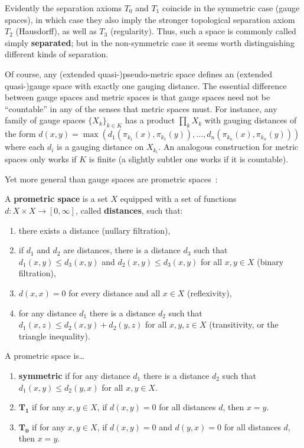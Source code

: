 \documentclass{article}
\def\Rp{[0,\infty]}
\begin{document}
Evidently the separation axioms $T_0$ and $T_1$ coincide in the symmetric case (gauge spaces), in which case they also imply the stronger topological separation axiom $T_2$ (Hausdorff), as well as $T_3$ (regularity).
Thus, such a space is commonly called simply \textbf{separated}; but in the non-symmetric case it seems worth distinguishing different kinds of separation.

Of course, any (extended quasi-)pseudo-metric space defines an (extended quasi-)gauge space with exactly one gauging distance.
The essential difference between gauge spaces and metric spaces is that gauge spaces need not be ``countable'' in any of the senses that metric spaces must.
For instance, any family of gauge spaces $\{X_k\}_{k\in K}$ has a product $\prod_k X_k$ with gauging distances of the form $d(x,y) = \max(d_1(\pi_{k_1}(x),\pi_{k_1}(y)),\dots,d_n(\pi_{k_n}(x),\pi_{k_n}(y)))$ where each $d_i$ is a gauging distance on $X_{k_i}$.
An analogous construction for metric spaces only works if $K$ is finite (a slightly subtler one works if it is countable).

Yet more general than gauge spaces are prometric spaces~\cite{cht:one-setting}:

\begin{defn}
  A \textbf{prometric space} is a set $X$ equipped with a set of functions $d:X\times X\to\Rp$, called \textbf{distances}, such that:
  \begin{enumerate}
  \item there exists a distance (nullary filtration),
  \item if $d_1$ and $d_2$ are distances, there is a distance $d_3$ such that $d_1(x,y)\le d_3(x,y)$ and $d_2(x,y)\le d_3(x,y)$ for all $x,y\in X$ (binary filtration),
  \item $d(x,x)=0$ for every distance and all $x\in X$ (reflexivity),
  \item for any distance $d_1$ there is a distance $d_2$ such that $d_1(x,z)\le d_2(x,y)+d_2(y,z)$ for all $x,y,z\in X$ (transitivity, or the triangle inequality).
  \end{enumerate}
  A prometric space is\dots
  \begin{enumerate}[resume]
  \item \textbf{symmetric} if for any distance $d_1$ there is a distance $d_2$ such that $d_1(x,y)\le d_2(y,x)$ for all $x,y\in X$.
  \item $\mathbf{T_1}$ if for any $x,y\in X$, if $d(x,y)=0$ for all distances $d$, then $x=y$.
  \item $\mathbf{T_0}$ if for any $x,y\in X$, if $d(x,y)=0$ and $d(y,x)=0$ for all distances $d$, then $x=y$.
  \end{enumerate}
\end{defn}
\end{document}
